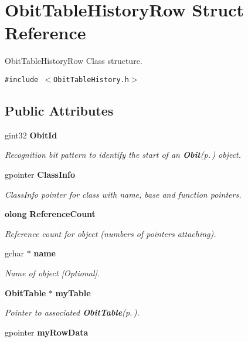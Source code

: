 \section{Obit\-Table\-History\-Row Struct Reference}
\label{structObitTableHistoryRow}
Obit\-Table\-History\-Row Class structure.  


{\tt \#include $<$Obit\-Table\-History.h$>$}

\subsection*{Public Attributes}
\begin{CompactItemize}
\item 
gint32 {\bf Obit\-Id}
\begin{CompactList}\small\item\em Recognition bit pattern to identify the start of an {\bf Obit}{\rm (p.\,\pageref{structObit})} object. \item\end{CompactList}\item 
gpointer {\bf Class\-Info}
\begin{CompactList}\small\item\em Class\-Info pointer for class with name, base and function pointers. \item\end{CompactList}\item 
{\bf olong} {\bf Reference\-Count}
\begin{CompactList}\small\item\em Reference count for object (numbers of pointers attaching). \item\end{CompactList}\item 
gchar $\ast$ {\bf name}
\begin{CompactList}\small\item\em Name of object [Optional]. \item\end{CompactList}\item 
{\bf Obit\-Table} $\ast$ {\bf my\-Table}
\begin{CompactList}\small\item\em Pointer to associated {\bf Obit\-Table}{\rm (p.\,\pageref{structObitTable})}. \item\end{CompactList}\item 
gpointer {\bf my\-Row\-Data}

\end{CompactItemize}
